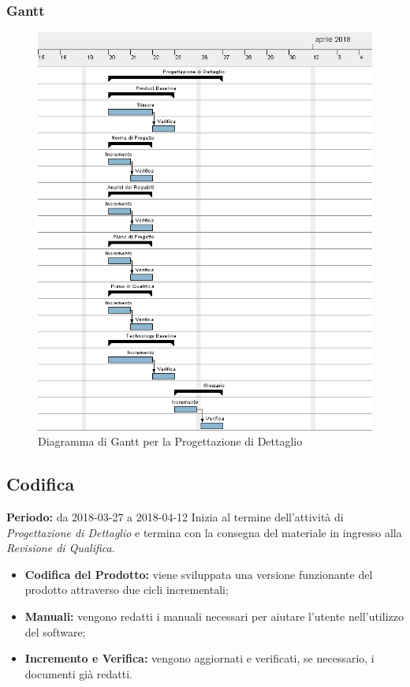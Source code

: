 \subsubsection{Gantt}
\begin{figure}[H]
	\centering 
	\includegraphics[width=1\textwidth]{images/Progettazione-Dettaglio.png}
	\caption{Diagramma di Gantt per la Progettazione di Dettaglio}
	\label{graficobello4} 
\end{figure}
\subsection{Codifica}
    \textbf{Periodo:} da 2018-03-27 a 2018-04-12\Spazio
    Inizia al termine dell'attività di \emph{Progettazione di Dettaglio} e termina con la consegna del materiale in ingresso alla \emph{Revisione di Qualifica}.
    \begin{itemize}
    	\item \textbf{Codifica del Prodotto:} viene sviluppata una versione funzionante del prodotto attraverso due cicli incrementali;
    	\item \textbf{Manuali:} vengono redatti i manuali necessari per aiutare l'utente nell'utilizzo del software;
    	\item \textbf{Incremento e Verifica:} vengono aggiornati e verificati, se necessario, i documenti già redatti.
    \end{itemize}
